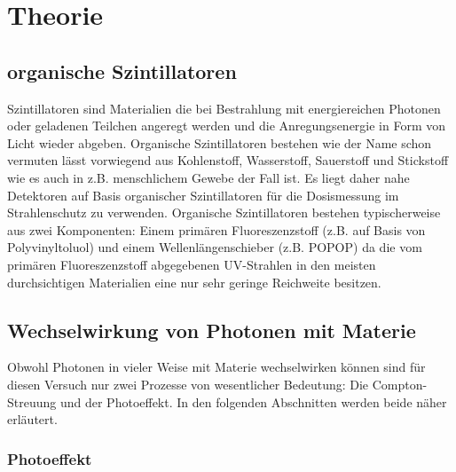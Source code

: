 \section{Theorie}

\subsection{organische Szintillatoren}

Szintillatoren sind  Materialien die bei Bestrahlung mit energiereichen Photonen oder geladenen Teilchen angeregt werden und die Anregungsenergie in Form von Licht wieder abgeben. Organische Szintillatoren bestehen wie der Name schon vermuten lässt vorwiegend aus Kohlenstoff, Wasserstoff, Sauerstoff und Stickstoff wie es auch in z.B. menschlichem Gewebe der Fall ist. Es liegt daher nahe Detektoren auf Basis organischer Szintillatoren für die Dosismessung im Strahlenschutz zu verwenden. Organische Szintillatoren bestehen typischerweise aus zwei Komponenten: Einem primären Fluoreszenzstoff (z.B. auf Basis von Polyvinyltoluol) und einem \glqq Wellenlängenschieber \grqq{} (z.B. POPOP) da die vom primären Fluoreszenzstoff abgegebenen UV-Strahlen in den meisten durchsichtigen Materialien eine nur sehr geringe Reichweite besitzen.

\subsection{Wechselwirkung von Photonen mit Materie}

Obwohl Photonen in vieler Weise mit Materie wechselwirken können sind für diesen Versuch nur zwei Prozesse von wesentlicher Bedeutung: Die Compton-Streuung und der Photoeffekt. In den folgenden Abschnitten werden beide näher erläutert.

\subsubsection{Photoeffekt}

